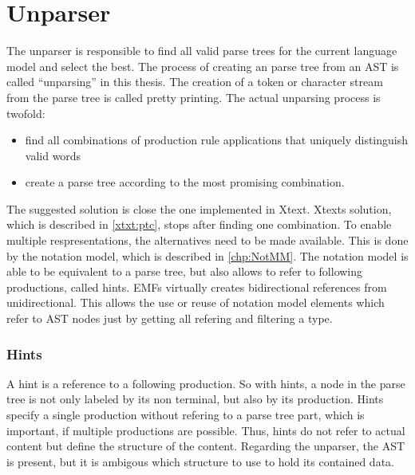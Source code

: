 \chapter{Unparser}
The unparser is responsible to find all valid parse trees for the current language model and select the best. The process of creating an parse tree from an AST is called ``unparsing'' in this thesis. The creation of a token or character stream from the parse tree is called pretty printing. The actual unparsing process is twofold:
\begin{itemize}
	\item find all combinations of production rule applications that uniquely distinguish valid words
	\item create a parse tree according to the most promising combination. 
\end{itemize}
 
The suggested solution is close the one implemented in Xtext. Xtexts solution, which is described in \ref{xtxt:ptc}, stops after finding one combination. 
To enable multiple respresentations, the alternatives need to be made available. This is done by the notation model, which is described in \ref{chp:NotMM}. The notation model is able to be equivalent to a parse tree, but also allows to refer to following productions, called hints. EMFs  virtually creates bidirectional references from unidirectional. This allows the use or reuse of notation model elements which refer to AST nodes just by getting all refering  and filtering a type.


\subsection {Hints}
A hint is a reference to a following production. So with hints, a node in the parse tree is not only labeled by its non terminal, but also by its production. Hints specify a single production without refering to a parse tree part, which is important, if multiple productions are possible. Thus, hints do not refer to actual content but define the structure of the content. Regarding the unparser, the AST is present, but it is ambigous which structure to use to hold its contained data.  

